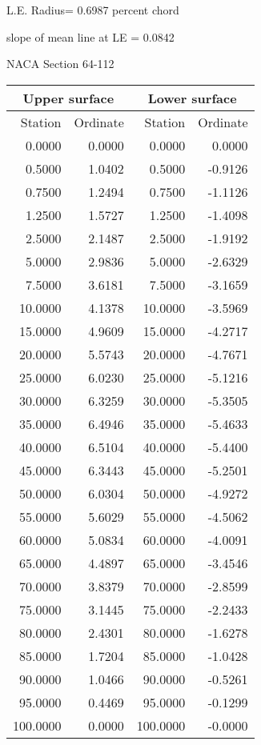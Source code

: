 \documentclass[11pt]{book}
\begin{document}
L.E. Radius=  0.6987 percent chord


 slope of mean line at LE =  0.0842
 \newpage
  \label{s64-112}
 \begin{Large}
 NACA Section 64-112
 \end{Large}
  
 \vspace{8mm}
 \begin{tabular}{|r|r|r|r|} \hline 
 \multicolumn{2}{|c|}{Upper surface} & \multicolumn{2}{|c|}{Lower surface} \\
 \hline
 Station & Ordinate & Station & Ordinate \\
 \hline
0.0000 & 0.0000 & 0.0000 & 0.0000 \\
0.5000 & 1.0402 & 0.5000 & -0.9126 \\
0.7500 & 1.2494 & 0.7500 & -1.1126 \\
1.2500 & 1.5727 & 1.2500 & -1.4098 \\
2.5000 & 2.1487 & 2.5000 & -1.9192 \\
5.0000 & 2.9836 & 5.0000 & -2.6329 \\
7.5000 & 3.6181 & 7.5000 & -3.1659 \\
10.0000 & 4.1378 & 10.0000 & -3.5969 \\
15.0000 & 4.9609 & 15.0000 & -4.2717 \\
20.0000 & 5.5743 & 20.0000 & -4.7671 \\
25.0000 & 6.0230 & 25.0000 & -5.1216 \\
30.0000 & 6.3259 & 30.0000 & -5.3505 \\
35.0000 & 6.4946 & 35.0000 & -5.4633 \\
40.0000 & 6.5104 & 40.0000 & -5.4400 \\
45.0000 & 6.3443 & 45.0000 & -5.2501 \\
50.0000 & 6.0304 & 50.0000 & -4.9272 \\
55.0000 & 5.6029 & 55.0000 & -4.5062 \\
60.0000 & 5.0834 & 60.0000 & -4.0091 \\
65.0000 & 4.4897 & 65.0000 & -3.4546 \\
70.0000 & 3.8379 & 70.0000 & -2.8599 \\
75.0000 & 3.1445 & 75.0000 & -2.2433 \\
80.0000 & 2.4301 & 80.0000 & -1.6278 \\
85.0000 & 1.7204 & 85.0000 & -1.0428 \\
90.0000 & 1.0466 & 90.0000 & -0.5261 \\
95.0000 & 0.4469 & 95.0000 & -0.1299 \\
100.0000 & 0.0000 & 100.0000 & -0.0000 \\
 \hline 
 \end{tabular}
\end{document}
